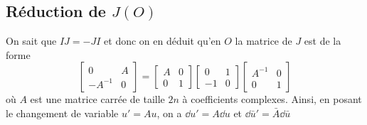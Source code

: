 \documentclass[12pt,draft]{amsart}
\numberwithin{equation}{subsection}
\begin{document}
\subsection{Réduction de $J(O)$} On sait que $IJ=-JI$ et donc on en déduit qu'en $O$ la matrice de $J$ est de la forme
\begin{equation}
\begin{bmatrix}
0 & A \\ 
-A^{-1} & 0
\end{bmatrix} = 
\begin{bmatrix}
A & 0 \\
0 & 1
\end{bmatrix}
\begin{bmatrix}
0 & 1 \\
-1 & 0
\end{bmatrix}
\begin{bmatrix}
A^{-1} & 0 \\
0 & 1
\end{bmatrix}
\end{equation}
où $A$ est une matrice carrée de taille $2n$ à coefficients complexes. Ainsi, en posant le changement de variable $u' =  Au$, on a $\dd u' = A \dd u$ et $\dd \bar{u}' = \bar{A} \dd \bar{u}$
\end{document}
